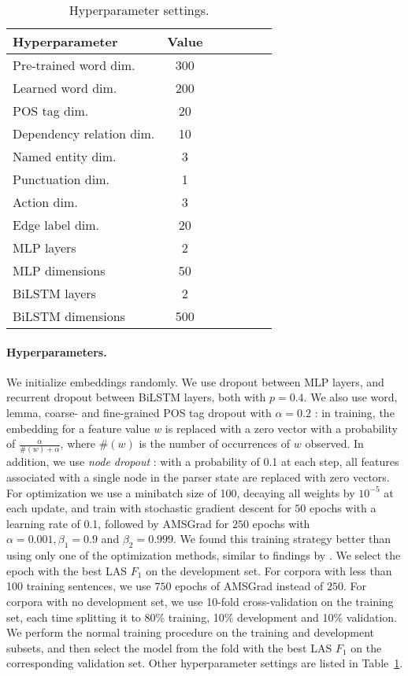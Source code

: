 \documentclass[11pt,a4paper]{article}
\begin{document}
\begin{table}[h]
\centering
\begin{tabular}{l|c|ccccc}
\hline
\bf Hyperparameter &  \bf Value \\
\hline
Pre-trained word dim. & 300 \\
Learned word dim. & 200 \\
POS tag dim. & 20 \\
Dependency relation dim. & 10 \\
Named entity dim. & 3 \\
Punctuation dim. & 1 \\
Action dim. & 3 \\
Edge label dim. & 20 \\
\hline
MLP layers & 2 \\
MLP dimensions & 50 \\
BiLSTM layers & 2 & \\
BiLSTM dimensions & 500
\end{tabular}
\caption{Hyperparameter settings.\label{tab:hyperparams}}
\end{table}


\paragraph{Hyperparameters.}

We initialize embeddings randomly.
We use dropout \cite{srivastava2014dropout} between MLP layers, and recurrent dropout
\cite{NIPS2016_6241} between BiLSTM layers, both with $p=0.4$.
We also use word, lemma, coarse- and fine-grained POS tag dropout
with $\alpha=0.2$
\cite{kiperwasser2016simple}: in training, the embedding for a feature value
$w$ is replaced with a zero vector with a probability of
$\frac{\alpha}{\#(w)+\alpha}$,
where $\#(w)$ is the number of occurrences of $w$ observed.
In addition, we use \textit{node dropout} \cite{hershcovich2018multitask}:
with a probability of 0.1 at each step, all features associated with a single
node in the parser state are replaced with zero vectors.
For optimization we use a minibatch size of 100, decaying all weights by $10^{-5}$ at each update,
and train with stochastic gradient descent for $50$ epochs with a learning
rate of 0.1, followed by AMSGrad \cite{j.2018on} for $250$ epochs with
$\alpha=0.001,\beta_1=0.9$ and $\beta_2=0.999$.
We found this training strategy better than using only one of the optimization methods,
similar to findings by \citet{keskar2017improving}.
We select the epoch with the best LAS $F_1$ on the
development set.
For corpora with less than 100 training sentences,
we use $750$ epochs of AMSGrad instead of $250$.
For corpora with no development set,
we use 10-fold cross-validation on the training set,
each time splitting it to 80\% training, 10\% development and 10\% validation.
We perform the normal training procedure on the training and development
subsets, and then select the model from the fold with the best LAS $F_1$
on the corresponding validation set.
Other hyperparameter settings are listed in Table~\ref{tab:hyperparams}.
\end{document}
